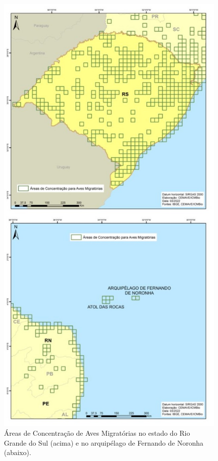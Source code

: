 \documentclass[
  oneside]{scrbook}
\begin{document}
\begin{figure}[H]

{\centering \includegraphics[width=0.7\linewidth]{imagens/cap07/Fig_24_RS_FN} 

}

\caption{Áreas de Concentração de Aves Migratórias no estado do Rio Grande do Sul (acima) e no arquipélago de Fernando de Noronha (abaixo).}\label{fig:44}
\end{figure}
\end{document}
